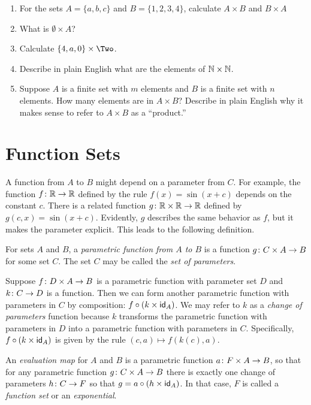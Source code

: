 \begin{exercises}
	\begin{enumerate}
		\item For the sets $A = \{a,b,c\}$ and $B = \{1,2,3,4\}$, calculate $A\times B$ and $B\times A$
		\item What is $\emptyset \times A$? 
		\item Calculate $\{4,a,0\}\times \Two$.
		\item Describe in plain English what are the elements of $\mathbb N\times \mathbb N$.
		\item Suppose $A$ is a finite set with $m$ elements and $B$ is a finite set with $n$ elements.
		How many elements are in $A\times B$?
		Describe in plain English why it makes sense to refer to $A\times B$ as a ``product.''
	\end{enumerate}
\end{exercises}

\section{Function Sets}

A function from $A$ to $B$ might depend on a parameter from $C$. 
For example, the function ${f}\colon{\mathbb R}\to{\mathbb R}$ defined by the rule $f(x) = \sin(x + c)$ depends on the constant $c$.
There is a related function ${g}\colon{\mathbb R\times \mathbb R}\to{\mathbb R}$ defined by $g(c,x) = \sin(x+c)$.
Evidently, $g$ describes the same behavior as $f$, but it makes the parameter explicit.
This leads to the following definition.

\begin{defn}
	For sets $A$ and $B$, a \emph{parametric function from $A$ to $B$} is a function ${g}\colon{C\times A}\to{B}$ for some set $C$.
	The set $C$ may be called the \emph{set of parameters}.
	
	Suppose ${f}\colon{D\times A}\to{B}$ is a parametric function with parameter set $D$ and ${k}\colon{C}\to{D}$ is a function.
	Then we can form another parametric function with parameters in $C$ by composition: $f\circ (k\times \textsf{id}_A)$.
	We may refer to $k$ as a \emph{change of parameters} function because $k$ transforms the parametric function with parameters in $D$ into a parametric function with parameters in $C$. 
	Specifically, $f\circ(k\times \textsf{id}_A)$ is given by the rule $(c,a)\mapsto f(k(c),a)$. 
	
	An \emph{evaluation map} for $A$ and $B$ is a parametric function ${a}\colon{F\times A}\to{B}$, so that for any 
	parametric function ${g}\colon{C\times A}\to{B}$ there is exactly one change of parameters ${h}\colon{C}\to{F}$ so that
	$g = a\circ (h\times \textsf{id}_A)$. In that case, $F$ is called a \emph{function set} or an \emph{exponential}.
\end{defn}

